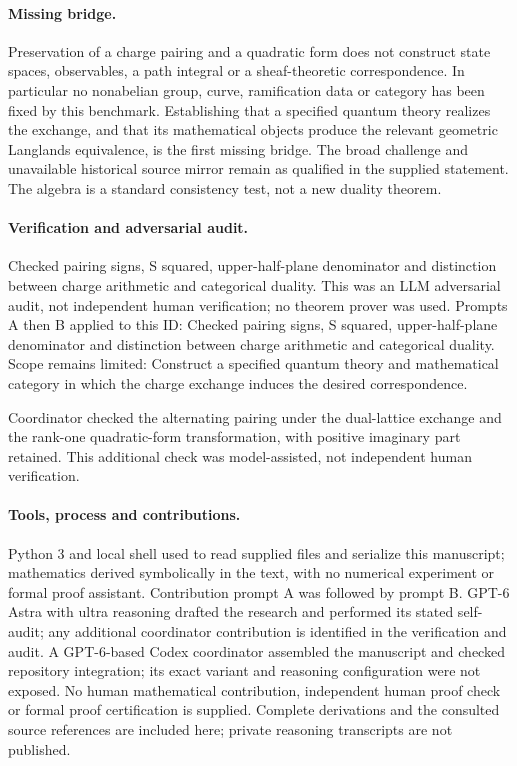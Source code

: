 \documentclass[11pt]{article}
\begin{document}
\paragraph{Missing bridge.}Preservation of a charge pairing and a quadratic form does not construct state spaces, observables, a path integral or a sheaf-theoretic correspondence. In particular no nonabelian group, curve, ramification data or category has been fixed by this benchmark. Establishing that a specified quantum theory realizes the exchange, and that its mathematical objects produce the relevant geometric Langlands equivalence, is the first missing bridge. The broad challenge and unavailable historical source mirror remain as qualified in the supplied statement. The algebra is a standard consistency test, not a new duality theorem.

\paragraph{Verification and adversarial audit.}
Checked pairing signs, S squared, upper-half-plane denominator and distinction between charge arithmetic and categorical duality. This was an LLM adversarial audit, not independent human verification; no theorem prover was used. Prompts A then B applied to this ID: Checked pairing signs, S squared, upper-half-plane denominator and distinction between charge arithmetic and categorical duality. Scope remains limited: Construct a specified quantum theory and mathematical category in which the charge exchange induces the desired correspondence.

Coordinator checked the alternating pairing under the dual-lattice exchange and the rank-one quadratic-form transformation, with positive imaginary part retained. This additional check was model-assisted, not independent human verification.

\paragraph{Tools, process and contributions.}
Python 3 and local shell used to read supplied files and serialize this manuscript; mathematics derived symbolically in the text, with no numerical experiment or formal proof assistant. Contribution prompt A was followed by prompt B. GPT-6 Astra with ultra reasoning drafted the research and performed its stated self-audit; any additional coordinator contribution is identified in the verification and audit. A GPT-6-based Codex coordinator assembled the manuscript and checked repository integration; its exact variant and reasoning configuration were not exposed. No human mathematical contribution, independent human proof check or formal proof certification is supplied. Complete derivations and the consulted source references are included here; private reasoning transcripts are not published.
\end{document}
